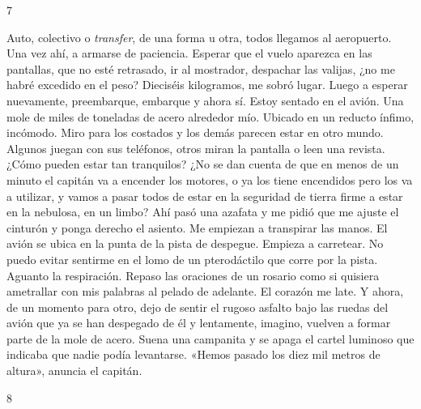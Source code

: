 \documentclass[12pt,twoside,openright,a5paper]{book}
\begin{document}
\vspace{0.5cm}
\afterpage{}
\hrulefill \hspace{0.1cm}\decofourleft\hspace{0.2cm} 7 \hspace{0.2cm}\decofourright \hspace{0.1cm}\hrulefill

\nopagebreak

\vspace{0.5cm}

\nopagebreak

Auto, colectivo o \emph{transfer}, de una forma u otra, todos llegamos al
aeropuerto. Una vez ahí, a armarse de paciencia. Esperar que el vuelo
aparezca en las pantallas, que no esté retrasado, ir al mostrador,
despachar las valijas, ¿no me habré excedido en el peso? Dieciséis kilogramos, me sobró
lugar. Luego a esperar nuevamente, preembarque, embarque y ahora sí. Estoy
sentado en el avión. Una mole de miles de toneladas de acero alrededor
mío. Ubicado en un reducto ínfimo, incómodo. Miro para los costados y
los demás parecen estar en otro mundo. Algunos juegan con sus teléfonos,
otros miran la pantalla o leen una revista. ¿Cómo pueden estar tan
tranquilos? ¿No se dan cuenta de que en menos de un minuto el capitán va
a encender los motores, o ya los tiene encendidos pero los va a utilizar, y
vamos a pasar todos de estar en la seguridad de tierra firme a estar en la
nebulosa, en un limbo? Ahí pasó una azafata y me pidió que me ajuste el
cinturón y ponga derecho el asiento. Me empiezan a transpirar las manos. El
avión se ubica en la punta de la pista de despegue. Empieza a carretear. No
puedo evitar sentirme en el lomo de un pterodáctilo que corre por la
pista. Aguanto la respiración. Repaso las oraciones de un rosario como si
quisiera ametrallar con mis palabras al pelado de adelante. El corazón me
late. Y ahora, de un momento para otro, dejo de sentir el rugoso asfalto
bajo las ruedas del avión que ya se han despegado de él y lentamente, imagino,
vuelven a formar parte de la mole de acero. Suena una campanita y se apaga
el cartel luminoso que indicaba que nadie podía levantarse. 
«Hemos pasado los diez mil metros de altura», anuncia el capitán.

\vspace{0.5cm}

\hrulefill \hspace{0.1cm}\decofourleft\hspace{0.2cm} 8 \hspace{0.2cm}\decofourright \hspace{0.1cm}\hrulefill
\end{document}
